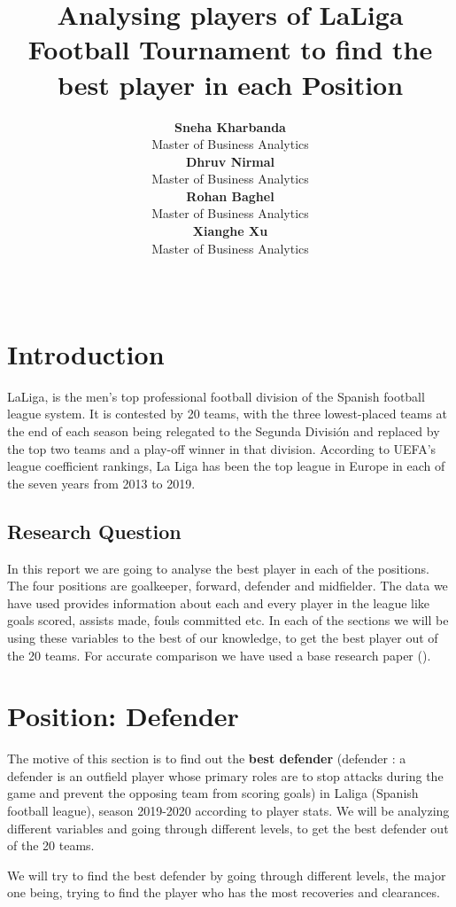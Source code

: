 \documentclass[11pt,a4paper,]{article}
\title{Analysing players of LaLiga Football Tournament to find the best player in each Position}
\author{\sf\Large\textbf{ Sneha Kharbanda}\\ {\sf\large Master of Business Analytics\\[0.5cm]} \sf\Large\textbf{ Dhruv Nirmal}\\ {\sf\large Master of Business Analytics\\[0.5cm]} \sf\Large\textbf{ Rohan Baghel}\\ {\sf\large Master of Business Analytics\\[0.5cm]} \sf\Large\textbf{ Xianghe Xu}\\ {\sf\large Master of Business Analytics\\[0.5cm]}}
\date{\sf\Date~\Month~\Year}
\makeatletter
\def\titlepage{\front{\expandafter{\@title}}{\@author}{\@organization}}
\makeatother
\begin{document}
\titlepage

\hypertarget{introduction}{%
\section{Introduction}\label{introduction}}

LaLiga, is the men's top professional football division of the Spanish football league system. It is contested by 20 teams, with the three lowest-placed teams at the end of each season being relegated to the Segunda División and replaced by the top two teams and a play-off winner in that division. According to UEFA's league coefficient rankings, La Liga has been the top league in Europe in each of the seven years from 2013 to 2019.

\hypertarget{research-question}{%
\subsection{Research Question}\label{research-question}}

In this report we are going to analyse the best player in each of the positions. The four positions are goalkeeper, forward, defender and midfielder. The data we have used provides information about each and every player in the league like goals scored, assists made, fouls committed etc. In each of the sections we will be using these variables to the best of our knowledge, to get the best player out of the 20 teams. For accurate comparison we have used a base research paper (\textcite{dellal2011comparison}).

\hypertarget{position-defender}{%
\section{Position: Defender}\label{position-defender}}

The motive of this section is to find out the \textbf{best defender} (defender : a defender is an outfield player whose primary roles are to stop attacks during the game and prevent the opposing team from scoring goals) in Laliga (Spanish football league), season 2019-2020 according to player stats. We will be analyzing different variables and going through different levels, to get the best defender out of the 20 teams.

We will try to find the best defender by going through different levels, the major one being, trying to find the player who has the most recoveries and clearances.
\end{document}
